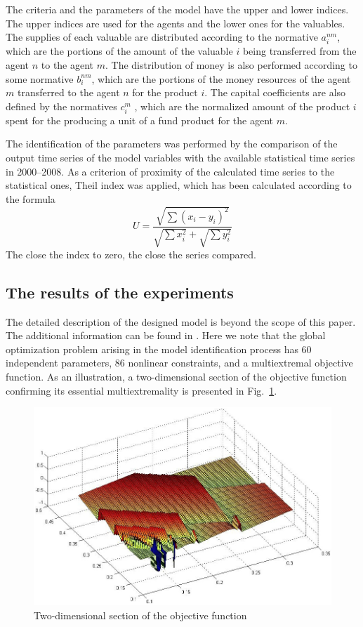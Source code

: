 The criteria and the parameters of the model have the upper and lower indices. The upper indices are used for the agents and the lower ones for the valuables. The supplies of each valuable are distributed according to the normative  $a_i^{nm}$, which are the portions of the amount of the valuable $i$ being transferred from the agent $n$ to the agent $m$. The distribution of money is also performed according to some normative $b_i^{nm}$, which are the portions of the money resources of the agent $m$ transferred to the agent $n$ for the product $i$. The capital coefficients are also defined by the normatives $c_i^m$ , which are the normalized amount of the product $i$ spent for the producing a unit of a fund product for the agent $m$.

The identification of the parameters was performed by the comparison of the output time series of the model variables with the available statistical time series in 2000--2008. As a criterion of proximity of the calculated time series to the statistical ones, Theil index was applied, which has been calculated according to the formula
\[
U=\frac{\sqrt{\sum{(x_i-y_i)^2}}}{\sqrt{\sum{x_i^2}}+\sqrt{\sum{y_i^2}}}
\]
The close the index to zero, the close the series compared.

\subsection{The results of the experiments}

The detailed description of the designed model is beyond the scope of this paper. The additional information can be found in \cite{8_Gergel2011}. Here we note that the global optimization problem arising in the model identification process has $60$ independent parameters, $86$ nonlinear constraints, and a multiextremal objective function. As an illustration, a two-dimensional section of the objective function confirming its essential multiextremality is presented in Fig.~\ref{8_fig_7}. 

\begin{figure}[t]
\includegraphics[width=0.8\linewidth]{figures/8_7.png}
\caption{Two-dimensional section of the objective function}
\label{8_fig_7}     
\end{figure}


